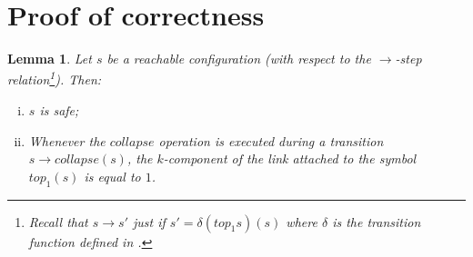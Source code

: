 \documentclass{article}
\newtheorem{lemma}{Lemma}[section]
\theoremstyle{remark}
\theoremstyle{definition}
\begin{document}
\section{Proof of correctness}

\begin{lemma}
Let $s$ be a reachable configuration (with respect to the
$\rightarrow$-step relation\footnote{Recall that $s\rightarrow s'$
just if $s' = \delta(top_1 s)(s)$ where $\delta$ is the transition
function defined in \cite[Figure 2]{hague-sto07}.}). Then:
\begin{enumerate}[i.]
\item $s$ is safe;
\item Whenever the $collapse$ operation is executed during a
transition $s \rightarrow collapse(s)$, the $k$-component of the link attached to the symbol $top_1(s)$ is equal to $1$.
\end{enumerate}
\end{lemma}
\end{document}
